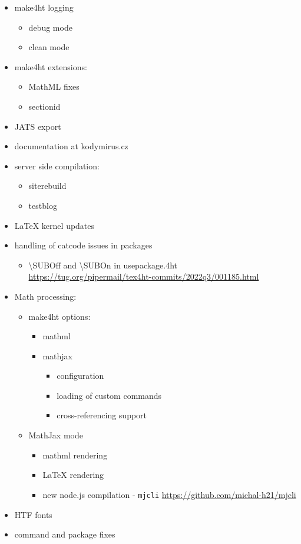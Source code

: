 \documentclass{ltugboat}
\begin{document}
\begin{itemize}
\item make4ht logging
  \begin{itemize}
  \item debug mode
  \item clean mode
  \end{itemize}

\item make4ht extensions:
  \begin{itemize}
  \item MathML fixes
  \item sectionid
  \end{itemize}
  
\item JATS export
\item documentation at kodymirus.cz
\item server side compilation:
  \begin{itemize}
  \item siterebuild
  \item testblog
  \end{itemize}

\item LaTeX kernel updates
\item handling of catcode issues in packages
  \begin{itemize}
  \item \textbackslash SUBOff and \textbackslash SUBOn in usepackage.4ht
    \url{https://tug.org/pipermail/tex4ht-commits/2022q3/001185.html}
  \end{itemize}
\item Math processing:
  \begin{itemize}
  \item make4ht options:
    \begin{itemize}
    \item mathml
    \item mathjax
      \begin{itemize}
      \item configuration
      \item loading of custom commands
      \item cross-referencing support
      \end{itemize}
    \end{itemize}
  \item MathJax mode
    \begin{itemize}
    \item mathml rendering
    \item LaTeX rendering
    \item
      new node.js compilation - \texttt{mjcli}
      \url{https://github.com/michal-h21/mjcli}
    \end{itemize}
  \end{itemize}
\item HTF fonts
\item command and package fixes


\end{itemize}
\end{document}
